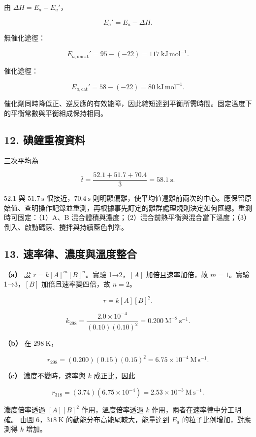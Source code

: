 \documentclass[11pt,a4paper]{article}
\begin{document}
由 \(\Delta H=E_a-E_a'\)，

\[
E_a'=E_a-\Delta H.
\]

無催化途徑：

\[
E_{a,\mathrm{uncat}}'=95-(-22)=117\ \mathrm{kJ\,mol^{-1}}.
\]

催化途徑：

\[
E_{a,\mathrm{cat}}'=58-(-22)=80\ \mathrm{kJ\,mol^{-1}}.
\]

催化劑同時降低正、逆反應的有效能障，因此縮短達到平衡所需時間。固定溫度下的平衡常數與平衡組成保持相同。

\subsection{12. 碘鐘重複資料}\label{ux7898ux9418ux91cdux8907ux8cc7ux6599}

三次平均為

\[
\bar t=\frac{52.1+51.7+70.4}{3}
=58.1\ \mathrm s.
\]

\(52.1\) 與 \(51.7\ \mathrm s\) 很接近，\(70.4\ \mathrm s\) 則明顯偏離，使平均值遠離前兩次的中心。應保留原始值、查明操作記錄並重測，再根據事先訂定的離群處理規則決定如何匯總。重測時可固定：（1）A、B 混合體積與濃度；（2）混合前熱平衡與混合當下溫度；（3）倒入、啟動碼錶、攪拌與持續藍色判準。

\subsection{13. 速率律、濃度與溫度整合}\label{ux901fux7387ux5f8bux6fc3ux5ea6ux8207ux6eabux5ea6ux6574ux5408}

\textbf{（a）} 設 \(r=k[A]^m[B]^n\)。實驗 1→2，\([A]\) 加倍且速率加倍，故 \(m=1\)。實驗 1→3，\([B]\) 加倍且速率變四倍，故 \(n=2\)。

\[
r=k[A][B]^2.
\]

\[
k_{298}=\frac{2.0\times10^{-4}}{(0.10)(0.10)^2}
=0.200\ \mathrm{M^{-2}\,s^{-1}}.
\]

\textbf{（b）} 在 \(298\ \mathrm K\)，

\[
r_{298}=(0.200)(0.15)(0.15)^2
=6.75\times10^{-4}\ \mathrm{M\,s^{-1}}.
\]

\textbf{（c）} 濃度不變時，速率與 \(k\) 成正比，因此

\[
r_{318}=(3.74)(6.75\times10^{-4})
=2.53\times10^{-3}\ \mathrm{M\,s^{-1}}.
\]

濃度倍率透過 \([A][B]^2\) 作用，溫度倍率透過 \(k\) 作用，兩者在速率律中分工明確。
由圖 6，\(318\ \mathrm K\) 的動能分布高能尾較大，能量達到 \(E_a\) 的粒子比例增加，對應測得 \(k\) 增加。
\end{document}
